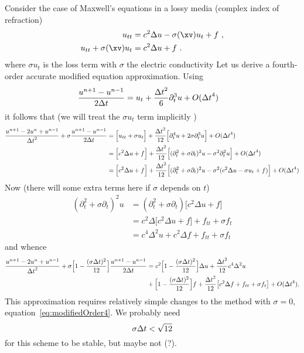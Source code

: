 Consider the case of Maxwell's equations in a lossy media (complex index of refraction)
\begin{align*}
    u_{tt} &= c^2 \Delta u - \sigma(\xv) u_t + f  ~,\\
    u_{tt} + \sigma(\xv) u_t &= c^2 \Delta u + f  ~.
\end{align*}
where $\sigma u_t$ is the loss term with $\sigma$ the electric conductivity
Let us derive a fourth-order accurate modified equation approximation.
Using
\begin{align*}
  {u^{n+1} - u^{n-1} \over 2 {\Delta t}} &= u_t + {{\Delta t}^2\over 6} \partial_t^3 u + O( {\Delta t}^4 )
\end{align*}
it follows that (we will treat the $\sigma u_t$ term implicitly )
\begin{align*}
 {  u^{n+1} -2 u ^n + u^{n-1} \over {\Delta t}^2} + \sigma { u^{n+1} - u^{n-1} \over 2{\Delta t}} &=
      \Big[ u_{tt} + \sigma u_t \Big] + \frac{{\Delta t}^2}{12}\Big[ \partial_t^4 u + 2\sigma \partial_t^3 u \Big] + O( {\Delta t}^4 ) \\
   &= \Big[ c^2 \Delta u + f \Big] + 
            \frac{{\Delta t}^2}{12}\Big[ (\partial_t^2 +\sigma\partial_t)^2 u - \sigma^2\partial_t^2 u \Big] + O( {\Delta t}^4) \\
   & = \Big[c^2 \Delta u + f \Big] + 
          \frac{{\Delta t}^2}{12}\Big[ (\partial_t^2 +\sigma\partial_t)^2 u - \sigma^2( c^2 \Delta u - \sigma u_t + f) \Big] + O( {\Delta t}^4) 
\end{align*}
Now (there will some extra terms here if $\sigma$ depends on $t$)
\begin{align*}
 (\partial_t^2 +\sigma\partial_t)^2 u &= (\partial_t^2 +\sigma\partial_t)\big[ c^2 \Delta u + f \big] \\
       &= c^2 \Delta\big[ c^2 \Delta u +f \big] + f_{tt} +\sigma f_t \\
       &= c^4 \Delta^2 u + c^2 \Delta f + f_{tt} +\sigma f_t
\end{align*}
and whence
\begin{align}
 {  u^{n+1} -2 u ^n + u^{n-1} \over {\Delta t}^2} + \sigma\Big[1-\frac{(\sigma{\Delta t})^2}{12}\Big] { u^{n+1} - u^{n-1} \over 2{\Delta t}} &=
    c^2 \Big[1-\frac{(\sigma{\Delta t})^2}{12}\Big] \Delta u + \frac{{\Delta t}^2}{12} c^4 \Delta^2 u \\
     & + \Big[1-\frac{(\sigma{\Delta t})^2}{12}\Big] f + \frac{{\Delta t}^2}{12}\big[  c^2 \Delta f + f_{tt} +\sigma f_t \big]+ O( {\Delta t}^4) .
\end{align}
This approximation requires relatively simple changes to the method with $\sigma=0$, equation~\eqref{eq:modifiedOrder4}.
%
We probably need 
\[
  \sigma{\Delta t} < \sqrt{12}
\]
for this scheme to be stable, but maybe not (?). 


